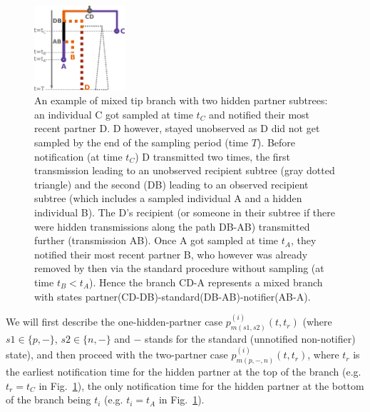 \documentclass[10pt,letterpaper]{article}
\begin{document}
\begin{figure}[tbhp]
\centering 
\includegraphics[width=0.3\textwidth]{Fig_mixed}
\caption{An example of mixed tip branch with two hidden partner subtrees: an individual C got sampled at time $t_C$ and notified their most recent partner D. D however, stayed unobserved as D did not get sampled by the end of the sampling period (time $T$). Before notification (at time $t_C$) D transmitted two times, the first transmission leading to an unobserved recipient subtree (gray dotted triangle) and the second (DB) leading to an observed recipient subtree (which includes a sampled individual A and a hidden individual B). The D's recipient (or someone in their subtree if there were hidden transmissions along the path DB-AB) transmitted further (transmission AB). Once A got sampled at time $t_A$, they notified their most recent partner B, who however was already removed by then via the standard procedure without sampling (at time $t_B < t_A$). Hence the branch CD-A represents a mixed branch with states partner(CD-DB)-standard(DB-AB)-notifier(AB-A). }
\label{fig:pn-mixed} 
\end{figure}


We will first describe the one-hidden-partner case $p_{m(s1,s2)}^{(i)}(t,t_r)$ (where $s1 \in \{p, -\}$, $s2 \in \{n, -\}$ and $-$ stands for the standard (unnotified non-notifier) state), and then proceed with the two-partner case $p_{m(p,-,n)}^{(i)}(t,t_{r})$, where $t_{r}$ is the earliest notification time for the hidden partner at the top of the branch (e.g. $t_r=t_C$ in Fig.~\ref{fig:pn-mixed}), the only notification time for the hidden partner at the bottom of the branch being $t_i$  (e.g. $t_i=t_A$ in Fig.~\ref{fig:pn-mixed}).
\end{document}

